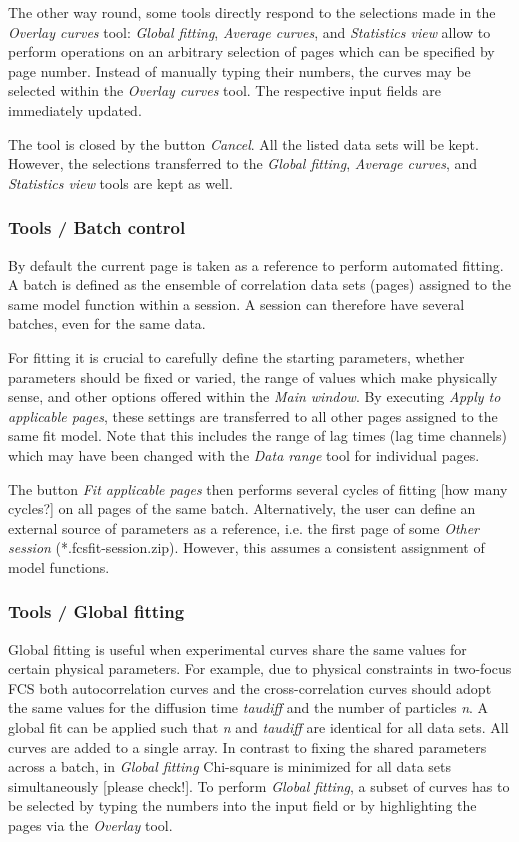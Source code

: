 The other way round, some tools directly respond to the selections made in the \textit{Overlay curves} tool: \textit{Global fitting}, \textit{Average curves}, and \textit{Statistics view} allow to perform operations on an arbitrary selection of pages which can be specified by page number. Instead of manually typing their numbers, the curves may be selected within the \textit{Overlay curves} tool. The respective input fields are immediately updated.

The tool is closed by the button \textit{Cancel}. All the listed data sets will be kept. However, the selections transferred to the \textit{Global fitting}, \textit{Average curves}, and \textit{Statistics view} tools are kept as well.

\subsubsection{Tools / Batch control}

By default the current page is taken as a reference to perform automated fitting. A batch is defined as the ensemble of correlation data sets (pages) assigned to the same model function within a session. A session can therefore have several batches, even for the same data. 

For fitting it is crucial to carefully define the starting parameters, whether parameters should be fixed or varied, the range of values which make physically sense, and other options offered within the \textit{Main window}. By executing \textit{Apply to applicable pages}, these settings are transferred to all other pages assigned to the same fit model. Note that this includes the range of lag times (lag time channels) which may have been changed with the \textit{Data range }tool for individual pages.

The button \textit{Fit applicable pages} then performs several cycles of fitting [how many cycles?] on all pages of the same batch. Alternatively, the user can define an external source of parameters as a reference, i.e. the first page of some \textit{Other session} (*.fcsfit-session.zip). However, this assumes a consistent assignment of model functions.

\subsubsection{Tools / Global fitting}

Global fitting is useful when experimental curves share the same values for certain physical parameters. For example, due to physical constraints in two-focus FCS both autocorrelation curves and the cross-correlation curves should adopt the same values for the diffusion time \textit{taudiff} and the number of particles \textit{n}. A global fit can be applied such that \textit{n} and \textit{taudiff} are identical for all data sets. All curves are added to a single array. In contrast to fixing the shared parameters across a batch, in \textit{Global fitting} Chi-square is minimized for all data sets simultaneously [please check!]. To perform \textit{Global fitting}, a subset of curves has to be selected by typing the numbers into the input field or by highlighting the pages via the \textit{Overlay} tool. 

